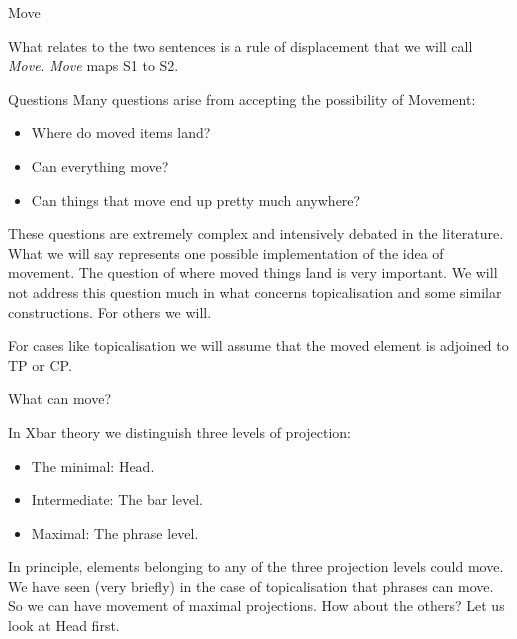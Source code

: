 \begin{frame}
  {Move}

What relates to the two sentences is a rule of displacement that we will call \textit{Move}. \textit{Move} maps S1 to S2.
 

\end{frame}


\begin{frame}
  {Questions}
Many questions arise from accepting the possibility of Movement:
\begin{itemize}
\item Where do moved items land?
\item Can everything move?
\item Can things that move end up pretty much anywhere?
\end{itemize}
\end{frame}


\begin{frame}
  These questions are extremely complex and intensively debated in the literature.  What we will say represents one possible implementation of the idea of movement.  The question of where moved things land is very important.  We will not address this question much in what concerns topicalisation and some similar constructions.  For others we will. 

For cases like topicalisation we will assume that the moved element is adjoined to TP or CP.

\end{frame}


\begin{frame}
  {What can move?}


In Xbar theory we distinguish three levels of projection:

\begin{itemize}
\item The minimal:  Head.
\item Intermediate:  The bar level.
\item Maximal:  The phrase level.
\end{itemize}

In principle, elements belonging to any of the three projection levels could move.  We have seen (very briefly) in the case of topicalisation that phrases can move. So we can have movement of maximal projections.  How about the others?  Let us look at Head first. 


\end{frame}





